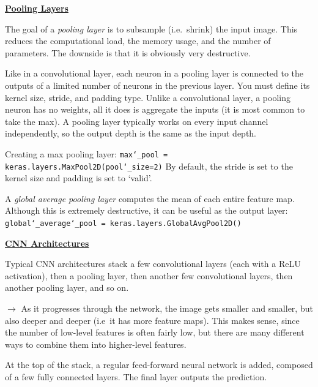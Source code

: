 \textbf{\underline{Pooling Layers}}

The goal of a \textit{pooling layer} is to subsample (i.e.~shrink) the input image.\newline
This reduces the computational load, the memory usage, and the number of parameters.\newline
The downside is that it is obviously very destructive.

Like in a convolutional layer,
each neuron in a pooling layer is connected to the outputs of a limited number of neurons in the previous layer.
You must define its kernel size, stride, and padding type.
Unlike a convolutional layer, a pooling neuron has no weights,
all it does is aggregate the inputs (it is most common to take the max).
A pooling layer typically works on every input channel independently,
so the output depth is the same as the input depth.

Creating a max pooling layer:\newline
\texttt{max\char`_pool = keras.layers.MaxPool2D(pool\char`_size=2)}\newline
By default, the stride is set to the kernel size and padding is set to `valid'.\newline

A \textit{global average pooling layer} computes the mean of each entire feature map.\newline
Although this is extremely destructive,
it can be useful as the output layer:\newline
\texttt{global\char`_average\char`_pool = keras.layers.GlobalAvgPool2D()}

\newpage
\textbf{\underline{CNN Architectures}}

Typical CNN architectures stack a few convolutional layers (each with a ReLU activation),
then a pooling layer, then another few convolutional layers, then another pooling layer, and so on.

$\rightarrow$ As it progresses through the network, the image gets smaller and smaller,
but also deeper and deeper (i.e~it has more feature maps).
This makes sense, since the number of low-level features is often fairly low,
but there are many different ways to combine them into higher-level features.

At the top of the stack,
a regular feed-forward neural network is added, composed of a few fully connected layers.
The final layer outputs the prediction.\newline

